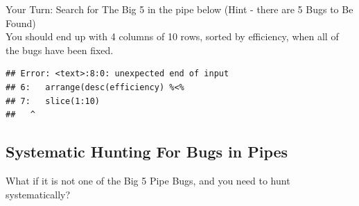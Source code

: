 \documentclass[
]{book}
\newenvironment{Shaded}{\begin{snugshade}}{\end{snugshade}}
\newcommand{\DataTypeTok}[1]{\textcolor[rgb]{0.13,0.29,0.53}{#1}}
\newcommand{\DecValTok}[1]{\textcolor[rgb]{0.00,0.00,0.81}{#1}}
\newcommand{\FloatTok}[1]{\textcolor[rgb]{0.00,0.00,0.81}{#1}}
\newcommand{\KeywordTok}[1]{\textcolor[rgb]{0.13,0.29,0.53}{\textbf{#1}}}
\newcommand{\NormalTok}[1]{#1}
\newcommand{\OperatorTok}[1]{\textcolor[rgb]{0.81,0.36,0.00}{\textbf{#1}}}
\newcommand{\StringTok}[1]{\textcolor[rgb]{0.31,0.60,0.02}{#1}}
\begin{document}
Your Turn:
Search for The Big 5 in the pipe below
(Hint - there are 5 Bugs to Be Found)\\
You should end up with 4 columns of 10 rows, sorted by efficiency, when all of the bugs have been fixed.

\begin{Shaded}
\end{Shaded}

\begin{verbatim}
## Error: <text>:8:0: unexpected end of input
## 6:   arrange(desc(efficiency) %<% 
## 7:   slice(1:10)
##   ^
\end{verbatim}

\hypertarget{systematic-hunting-for-bugs-in-pipes}{%
\subsection{Systematic Hunting For Bugs in Pipes}\label{systematic-hunting-for-bugs-in-pipes}}

What if it is not one of the Big 5 Pipe Bugs, and you need to hunt systematically?
\end{document}
